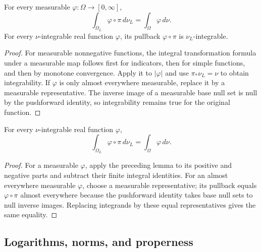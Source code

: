 \begin{lemma}\label{lem:separable-pullback-integrability}
\leanok
{}
For every measurable $\varphi:\Omega\to[0,\infty]$,
\[
 \int_{\Omega_L}\varphi\circ\pi\,d\nu_L=\int_\Omega\varphi\,d\nu.
\]
For every $\nu$-integrable real function $\varphi$, its pullback
$\varphi\circ\pi$ is $\nu_L$-integrable.
\end{lemma}
\begin{proof}
For measurable nonnegative functions, the integral transformation formula
under a measurable map follows first for indicators, then for simple
functions, and then by monotone convergence. Apply it to $|\varphi|$
and use $\pi_*\nu_L=\nu$ to obtain integrability. If $\varphi$
is only almost everywhere measurable, replace it by a measurable
representative. The inverse image of a measurable base null set is null
by the pushforward identity, so integrability remains true for the original
function.
\end{proof}

\begin{corollary}\label{cor:separable-pullback-integral}
\leanok
{}
For every $\nu$-integrable real function $\varphi$,
\[
 \int_{\Omega_L}\varphi\circ\pi\,d\nu_L=\int_\Omega\varphi\,d\nu.
\]
\end{corollary}
\begin{proof}
For a measurable $\varphi$, apply the preceding lemma to its positive
and negative parts and subtract their finite integral identities.
For an almost everywhere measurable $\varphi$, choose a measurable
representative; its pullback equals $\varphi\circ\pi$ almost everywhere
because the pushforward identity takes base null sets to null inverse
images. Replacing integrands by these equal representatives gives the
same equality.
\end{proof}

\subsection{Logarithms, norms, and properness}

